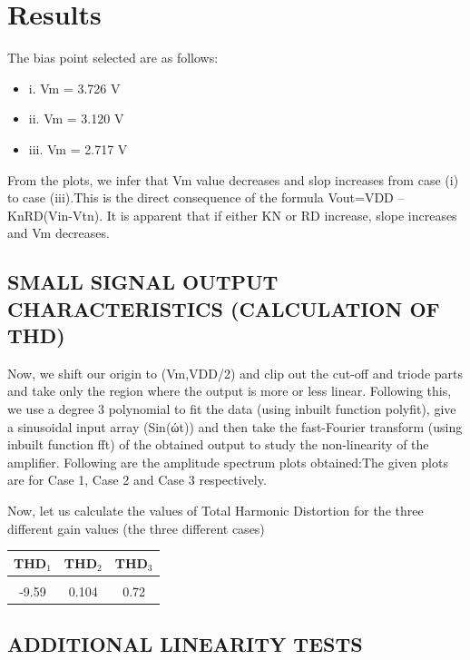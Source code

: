 \documentclass[12pt]{article}
\begin{document}
\section*{Results}

The bias point selected are as follows:

\begin{itemize}
\item i. Vm = 3.726 V

\item ii. Vm = 3.120 V

\item iii. Vm = 2.717 V
\end{itemize}

From the plots, we infer that Vm value decreases and slop increases from case (i) to case (iii).This is the direct consequence of the formula Vout=VDD – KnRD(Vin-Vtn). It is apparent that if either KN or RD increase, slope increases and Vm decreases.


\subsection*{SMALL SIGNAL OUTPUT CHARACTERISTICS (CALCULATION OF THD)}

Now, we shift our origin to (Vm,VDD/2) and clip out the cut-off and triode parts and take only the region where the output is more or less linear. Following this, we use a degree 3 polynomial to fit the data (using inbuilt function polyfit), give a sinusoidal input array (Sin(ώt)) and then take the fast-Fourier transform (using inbuilt function fft) of the obtained output to study the non-linearity of the amplifier. Following are the amplitude spectrum plots obtained:The given plots are for Case 1, Case 2 and Case 3 respectively.

Now, let us calculate the values of Total Harmonic Distortion for the three
different gain values (the three different cases)
\begin{center}
 \begin{tabular}{|| c | c| c ||}
 \hline
 \hline
 THD$_1$ & THD$_2$ & THD$_3$ \\
 \hline\hline\\
 -9.59 & 0.104 & 0.72\\
 \hline
\end{tabular}
\end{center}
 
\subsection*{ ADDITIONAL LINEARITY TESTS }
\end{document}
